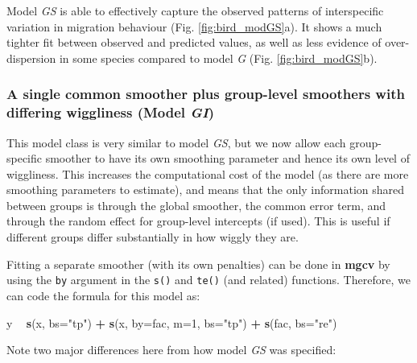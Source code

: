 \documentclass[12pt]{article}
\newenvironment{Shaded}{\begin{snugshade}}{\end{snugshade}}
\newcommand{\KeywordTok}[1]{\textcolor[rgb]{0.13,0.29,0.53}{\textbf{#1}}}
\newcommand{\DataTypeTok}[1]{\textcolor[rgb]{0.13,0.29,0.53}{#1}}
\newcommand{\DecValTok}[1]{\textcolor[rgb]{0.00,0.00,0.81}{#1}}
\newcommand{\StringTok}[1]{\textcolor[rgb]{0.31,0.60,0.02}{#1}}
\newcommand{\OperatorTok}[1]{\textcolor[rgb]{0.81,0.36,0.00}{\textbf{#1}}}
\newcommand{\NormalTok}[1]{#1}
\begin{document}
Model \emph{GS} is able to effectively capture the observed patterns of
interspecific variation in migration behaviour (Fig.
\ref{fig:bird_modGS}a). It shows a much tighter fit between observed and
predicted values, as well as less evidence of over-dispersion in some
species compared to model \emph{G} (Fig. \ref{fig:bird_modGS}b).

\subsubsection{\texorpdfstring{A single common smoother plus group-level
smoothers with differing wiggliness (Model
\emph{GI})}{A single common smoother plus group-level smoothers with differing wiggliness (Model GI)}}\label{a-single-common-smoother-plus-group-level-smoothers-with-differing-wiggliness-model-gi}

This model class is very similar to model \emph{GS}, but we now allow
each group-specific smoother to have its own smoothing parameter and
hence its own level of wiggliness. This increases the computational cost
of the model (as there are more smoothing parameters to estimate), and
means that the only information shared between groups is through the
global smoother, the common error term, and through the random effect
for group-level intercepts (if used). This is useful if different groups
differ substantially in how wiggly they are.

Fitting a separate smoother (with its own penalties) can be done in
\textbf{mgcv} by using the \texttt{by} argument in the \texttt{s()} and
\texttt{te()} (and related) functions. Therefore, we can code the
formula for this model as:

\begin{Shaded}
\begin{Highlighting}[]
\NormalTok{y }\OperatorTok{~}\StringTok{ }\KeywordTok{s}\NormalTok{(x, }\DataTypeTok{bs=}\StringTok{"tp"}\NormalTok{) }\OperatorTok{+}\StringTok{ }\KeywordTok{s}\NormalTok{(x, }\DataTypeTok{by=}\NormalTok{fac, }\DataTypeTok{m=}\DecValTok{1}\NormalTok{, }\DataTypeTok{bs=}\StringTok{"tp"}\NormalTok{) }\OperatorTok{+}\StringTok{ }\KeywordTok{s}\NormalTok{(fac, }\DataTypeTok{bs=}\StringTok{"re"}\NormalTok{)}
\end{Highlighting}
\end{Shaded}

Note two major differences here from how model \emph{GS} was specified:
\end{document}

